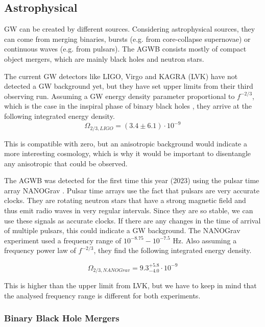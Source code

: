 \subsection{Astrophysical}
\label{astro_GWB}
GW can be created by different sources. Considering astrophysical sources, they can come from
merging binaries, bursts (e.g. from core-collapse supernovae) or continuous waves 
(e.g. from pulsars). 
The AGWB consists mostly of compact object mergers, which are mainly black holes and neutron stars. 

The current GW detectors like LIGO, Virgo and KAGRA (LVK) have not detected a GW background yet, but they have set upper limits from their third observing run. Assuming a GW energy density parameter proportional to $f^{-2/3}$, which is the case in the inspiral phase of binary black holes \cite{phinney_practical_2001}, they arrive at the following integrated energy density.
\begin{equation}
    \Omega_{2/3, LIGO} = (3.4 \pm 6.1) \cdot 10^{-9}
\end{equation}

This is compatible with zero, but an anisotropic background would indicate
a more interesting cosmology, which is why it would be important to disentangle
any anisotropic that could be observed.

The AGWB was detected for the first time this year (2023) using the pulsar time array NANOGrav \cite{agazie_nanograv_2023}. Pulsar time arrays use the fact that pulsars are very accurate clocks. They are rotating neutron stars that have a strong magnetic field and thus emit radio waves in very regular intervals. Since they are so stable, we can use these signals as accurate clocks. If there are any changes in the time of arrival of multiple pulsars, this could indicate a GW background. 
The NANOGrav experiment used a frequency range of $10^{-8.75} - 10^{-7.5}$ Hz. 
Also assuming a frequency power law of $f^{-2/3}$, they find the following integrated energy density.

\begin{equation}
    \Omega_{2/3, NANOGrav} = 9.3^{+5.8}_{-4.0}\cdot 10^{-9}
\end{equation}

This is higher than the upper limit from LVK, but we have to keep in mind that the analysed frequency range is different for both experiments.

\subsubsection{Binary Black Hole Mergers}
\label{BBH_mergers}

